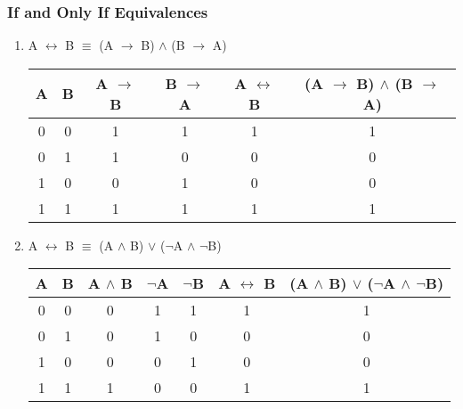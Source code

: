 \documentclass[11pt]{article}
\begin{document}
\subsubsection{If and Only If Equivalences}
\begin{enumerate}

  \item A $\leftrightarrow$ B $\equiv$ (A $\to$ B) $\land$ (B $\to$ A)

\begin{center}
  \begin{tabular} {| c | c | c | c | c | c |}
    \hline
    A & B & A $\to$ B & B $\to$ A & A $\leftrightarrow$ B & (A $\to$ B) $\land$ (B $\to$ A) \\ \hline
    0 & 0 & 1 & 1 & 1 & 1 \\
    0 & 1 & 1 & 0 & 0 & 0 \\
    1 & 0 & 0 & 1 & 0 & 0 \\
    1 & 1 & 1 & 1 & 1 & 1 \\ \hline
  \end{tabular} 
\end{center}

  \item A $\leftrightarrow$ B $\equiv$ (A $\land$ B) $\lor$ ($\neg$A $\land$ $\neg$B)

\begin{center}
  \begin{tabular} {| c | c | c | c | c | c | c |}
    \hline
    A & B & A $\land$ B & $\neg$A & $\neg$B & A $\leftrightarrow$ B & (A $\land$ B) $\lor$ ($\neg$A $\land$ $\neg$B) \\ \hline
    0 & 0 & 0 & 1 & 1 & 1 & 1 \\
    0 & 1 & 0 & 1 & 0 & 0 & 0 \\
    1 & 0 & 0 & 0 & 1 & 0 & 0 \\
    1 & 1 & 1 & 0 & 0 & 1 & 1 \\ \hline
  \end{tabular} 
\end{center}

\end{enumerate}
\end{document}

